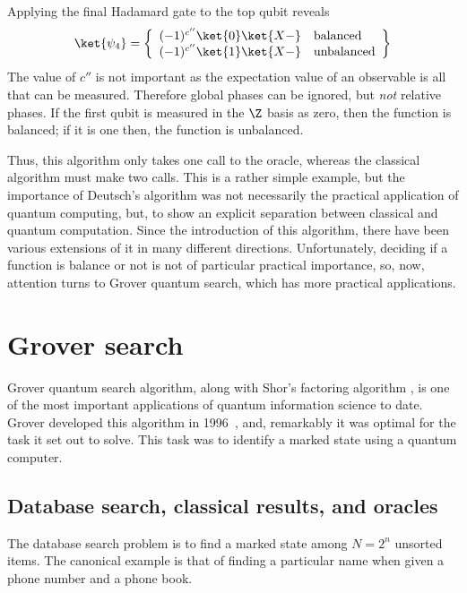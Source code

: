 \documentclass[11pt,oneside,final]{huthesis}%
\begin{document}
Applying the final Hadamard gate to the top qubit reveals
\begin{equation*}
	\ket{\psi_4}=\left\{ \begin{array}{ll} (-1)^{c''}\ket{0}\ket{X-} & \textrm{balanced}\\(-1)^{c''}\ket{1}\ket{X-}&\textrm{unbalanced}\end{array}\right\}
\end{equation*}
The value of $c''$ is not important as the expectation value of an observable is all that can be measured. Therefore global phases can be ignored, but \emph{not} relative phases.
If the first qubit is measured in the $\Z$ basis as zero, then the function is balanced; if it is one then, the function is unbalanced.

Thus, this algorithm only takes one call to the oracle, whereas the classical algorithm must make two calls.  This is a rather simple example, but the importance of Deutsch's algorithm was not necessarily the practical application of quantum computing, but, to show an explicit separation between classical and quantum computation.  Since the introduction of this algorithm, there have been various extensions of it in many different directions.  Unfortunately, deciding if a function is balance or not is not of particular practical importance, so, now, attention turns to Grover quantum search, which has more practical applications.

\section{Grover search}
\label{sec:Grover}

Grover quantum search algorithm, along with Shor's factoring algorithm \cite{Shor97}, is one of the most important applications of quantum information science to date.  Grover developed this algorithm in 1996~\cite{Grover96,Grover97}, and, remarkably it was optimal for the task it set out to solve.  This task was to identify a marked state using a quantum computer.

\subsection*{Database search, classical results, and oracles}
The database search problem is to find a marked state among $N=2^n$ unsorted items.  The canonical example is that of finding a particular name when given a phone number and a phone book.    
\end{document}
